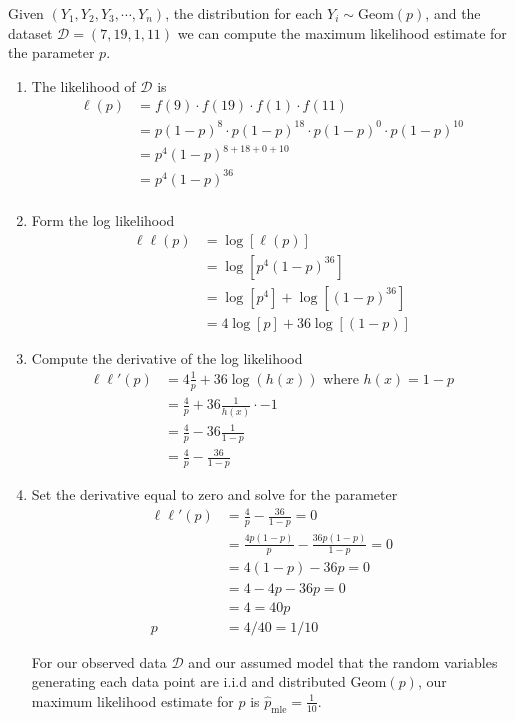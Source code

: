 \ex  Given $(Y_{1},Y_{2},Y_{3}, \cdots, Y_{n})$, the distribution for each $Y_{i} \sim \text{Geom}(p)$, and the dataset $\mathcal{D} = (7, 19, 1, 11)$ we can compute the maximum likelihood estimate for the parameter $p$. 
\begin{enumerate}
    \item The likelihood of $\mathcal{D}$ is
    \begin{align}
        \ell(p) &= f(9) \cdot f(19) \cdot f(1) \cdot f(11)\\
                &= p(1-p)^{8} \cdot p(1-p)^{18} \cdot p(1-p)^{0} \cdot p(1-p)^{10}\\
                &= p^{4} (1-p)^{8+18+0+10}\\
                &= p^{4} (1-p)^{36}\\
    \end{align}
    \item Form the log likelihood
    \begin{align}
        \ell \ell(p) &= \log\left[ \ell(p) \right] \\ 
                     &= \log \left[ p^{4} (1-p)^{36} \right] \\ 
                     &= \log \left[ p^{4} \right] + \log \left[(1-p)^{36} \right] \\
                     &= 4\log \left[ p \right] + 36\log \left[(1-p) \right] 
    \end{align}
    \item Compute the derivative of the log likelihood
    \begin{align}
        \ell \ell'(p) &= 4\frac{1}{p} + 36 \log( h(x) ) \text{ where } h(x) = 1-p\\
                      &= \frac{4}{p} + 36\frac{1}{h(x)} \cdot -1\\
                      &= \frac{4}{p} - 36\frac{1}{1-p} \\
                      &= \frac{4}{p} - \frac{36}{1-p}
    \end{align}
    \item Set the derivative equal to zero and solve for the parameter
    \begin{align}
        \ell \ell'(p)  &= \frac{4}{p} - \frac{36}{1-p} = 0 \\
                       &= \frac{ 4p(1-p) }{p} - \frac{36 p(1-p)}{1-p} = 0 \\ 
                       &=  4(1-p) - 36 p = 0 \\ 
                       &=  4 - 4p - 36 p = 0 \\ 
                       &=  4  = 40p \\ 
                     p &= 4/40 = 1/10  
    \end{align}
    
    For our observed data $\mathcal{D}$ and our assumed model that the random variables generating each data point are i.i.d and distributed $\text{Geom}(p)$, our maximum likelihood estimate for $p$ is $\hat{p}_{\text{mle}} = \frac{1}{10}$.

\end{enumerate}

